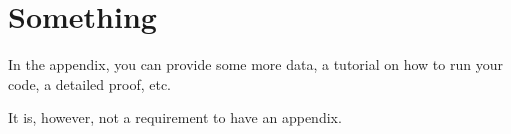 
\chapter{Something}\label{sec:something}

In the appendix, you can provide some more data, a tutorial on how to run your code, a detailed proof, etc.

It is, however, not a requirement to have an appendix.

\cleardoublepage